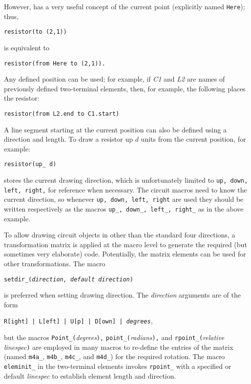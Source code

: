 However, \pic has a very useful concept of the current point (explicitly
named {\tt Here}); thus,
\par
{\tt resistor(to (2,1))}
\par
\noindent
is equivalent to
\par
{\tt resistor(from Here to (2,1)).}

Any defined position can be used; for example, if {\sl C1} and {\sl L2}
are names of previously defined two-terminal elements,
then, for example, the following places the resistor: 
\par
{\tt resistor(from L2.end to C1.start)}

A line segment starting at the current position can also be defined using
a direction and length.
To draw a resistor up $d$ units from the current position, for example:
\par
{\tt resistor(up\_ d)}

\Pic stores the current drawing direction,
which is unfortunately limited to {\tt up, down, left, right,}
for reference when necessary.
The circuit macros need to know the current direction, so
whenever {\tt up, down, left, right} are used they should be written
respectively as the macros {\tt up\_, down\_, left\_, right\_} as in
the above example.

To allow drawing circuit objects in other than the standard four directions,
a transformation matrix
is applied at the macro level to generate the required
(but sometimes very elaborate) \pic code.
Potentially, the matrix elements can be used for other transformations.
The macro

{\tt setdir\_({\sl direction, default direction})}

\noindent
is preferred when setting drawing direction.  The {\sl direction} arguments
are of the form

{\tt R[ight] | L[eft] | U[p] | D[own] | {\sl degrees}},

\noindent
but the macros
{\tt Point\_(}{\sl degrees}{\tt ),}
{\tt point\_(}{\sl radians}{\tt ),}
and {\tt rpoint\_(}{\sl relative linespec}{\tt )} are employed in many macros
to re-define the entries
of the matrix
(named {\tt m4a\_}, {\tt m4b\_}, {\tt m4c\_}, and {\tt m4d\_})
for the required rotation.
The macro {\tt eleminit\_} in the two-terminal elements invokes
{\tt rpoint\_} with a specified or default {\sl linespec}
to establish element length and direction.

